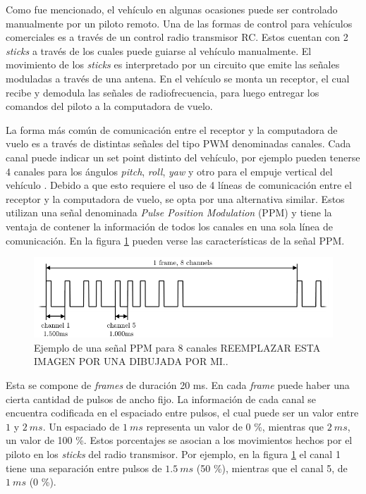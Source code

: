 Como fue mencionado, el vehículo en algunas ocasiones puede ser controlado manualmente por un piloto remoto. Una de las formas de control para vehículos comerciales es a través de un control radio transmisor RC. Estos cuentan con 2 \textit{sticks} a través de los cuales puede guiarse al vehículo manualmente. El movimiento de los \textit{sticks} es interpretado por un circuito que emite las señales moduladas a través de una antena. En el vehículo se monta un receptor, el cual recibe y demodula las señales de radiofrecuencia, para luego entregar los comandos del piloto a la computadora de vuelo.

La forma más común de comunicación entre el receptor y la computadora de vuelo es 
a través de distintas señales del tipo PWM denominadas canales. Cada canal puede indicar un set point distinto del vehículo, por ejemplo pueden tenerse 4 canales para los ángulos \textit{pitch}, \textit{roll}, \textit{yaw} y otro para el empuje vertical del vehículo \cite{garberoglio2019diseno}. Debido a que esto requiere el uso de 4 líneas de comunicación entre el receptor y la computadora de vuelo, se opta por una alternativa similar. %
Estos utilizan una señal denominada \textit{Pulse Position Modulation} (PPM) y tiene la ventaja de contener la información de todos los canales en una sola línea de comunicación. En la figura \ref{fig:senial_ppm} pueden verse las características de la señal PPM.

\begin{figure}[H]
    \centering
    \includegraphics[width=\textwidth]{img/senial_ppm.png}
    \caption{Ejemplo de una señal PPM para 8 canales {\color{red} REEMPLAZAR ESTA IMAGEN POR UNA DIBUJADA POR MI.}.}
    \label{fig:senial_ppm}
\end{figure}

Esta se compone de \textit{frames} de duración 20 ms. En cada \textit{frame} puede haber una cierta cantidad de pulsos de ancho fijo. La información de cada canal se encuentra codificada en el espaciado entre pulsos, el cual puede ser un valor entre $1$ y $2 \ ms$. Un espaciado de $1 \ ms$ representa un valor de 0 \%, mientras que $2 \ ms$, un valor de 100 \%. Estos porcentajes se asocian a los movimientos hechos por el piloto en los \textit{sticks} del radio transmisor. Por ejemplo, en la figura \ref{fig:senial_ppm} el canal 1 tiene una separación entre pulsos de $1.5 \ ms$ (50 \%), mientras que el canal 5, de $1 \ ms$ (0 \%).

